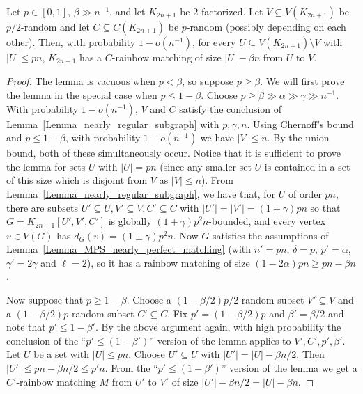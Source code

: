 \begin{lemma}\label{Lemma_nearly_perfect_matching}
Let $p\in [0,1]$, $\beta \gg n^{-1}$, and let  $K_{2n+1}$ be $2$-factorized.
Let $V\subseteq V(K_{2n+1})$ be $p/2$-random and let $C\subseteq C(K_{2n+1})$ be $p$-random (possibly depending on each other). Then, with  probability $1-o(n^{-1})$, for every $U\subseteq V(K_{2n+1})\setminus V$  with $|U|\leq pn$, $K_{2n+1}$ has a $C$-rainbow matching of size $|U|-\beta n$ from $U$ to $V$.
\end{lemma}
\begin{proof}
The lemma is vacuous when $p<\beta$, so suppose $p\geq \beta$. We will first prove the lemma in the special case when $p\leq 1-\beta$.
 Choose $p\geq \beta\gg \alpha \gg \gamma\gg n^{-1}$.
With probability $1-o(n^{-1})$, $V$ and $C$ satisfy the conclusion of Lemma~\ref{Lemma_nearly_regular_subgraph}  with $p, \gamma, n$.
Using Chernoff's bound and $p\leq 1-\beta$, with probability $1-o(n^{-1})$ we have $|V|\leq n$. By the union bound, both of these simultaneously occur.
Notice that it is sufficient to prove the lemma for sets $U$ with $|U|=pn$ (since any smaller set $U$  is contained in a set of this size which is disjoint from $V$ as $|V| \leq n$).
From Lemma~\ref{Lemma_nearly_regular_subgraph}, we have that, for $U$ of order $pn$, there are subsets $U'\subseteq U, V'\subseteq V, C'\subseteq C$ with $|U'|=|V'|= (1\pm\gamma)pn$
so that $G=K_{2n+1}[U',V',C']$ is globally $(1+\gamma)p^2n$-bounded, and every vertex $v\in V(G)$ has $d_{G}(v)=(1\pm\gamma)p^2n$. Now $G$ satisfies the assumptions of Lemma~\ref{Lemma_MPS_nearly_perfect_matching} (with $n'=pn$, $\delta =p$, $p'= \alpha$, $\gamma'=2\gamma$ and $\ell=2$), so it has a rainbow matching of size  $(1-2\alpha)pn\geq pn-\beta n$.

Now suppose that $p\geq 1-\beta$. Choose a $(1-\beta/2)p/2$-random subset $V'\subseteq V$ and a $(1-\beta/2)p$-random subset $C'\subseteq C$. Fix $p'=(1-\beta/2)p$ and $\beta'=\beta/2$ and note that $p' \leq 1-\beta'$. By the above argument again, with high probability the conclusion of the ``$p'\leq (1-\beta')$'' version of the lemma applies to $V',C',p',\beta'$. Let $U$ be a set with $|U| \leq pn$. Choose $U'\subseteq U$ with $|U'|=|U|-\beta n/2$. Then $|U'| \leq pn - \beta n/2 \leq p'n$.
From the ``$p'\leq (1-\beta')$'' version of the lemma we get a $C'$-rainbow matching $M$ from $U'$ to $V'$ of size $|U'|-\beta n/2= |U|-\beta n$.
\end{proof}


